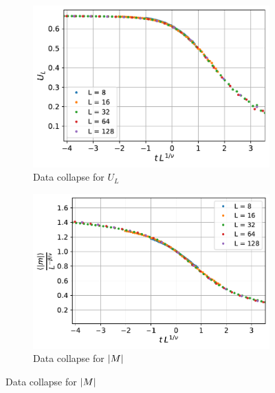 \documentclass[../journal_main.tex]{subfiles}
\begin{document}
\begin{figure}[!htb]
    \centering
    \begin{subfigure}[b]{0.47\textwidth}  %
        \centering
        \includegraphics[width=\textwidth]{images/data collapse/U_L data collapse.pdf}
        \caption{Data collapse for $U_L$}
        \label{U_L collapse}
    \end{subfigure}
    \hspace{1em}  %
    \vspace{1em}
    \begin{subfigure}[b]{0.47\textwidth}
        \centering
        \includegraphics[width=\textwidth]{images/data collapse/abs(mag) data collapse.pdf}
        \caption{Data collapse for $\abs{M}$}
        \label{absmag collapse}
    \end{subfigure}
    \hspace{1em}  %

\end{figure}
\end{document}
